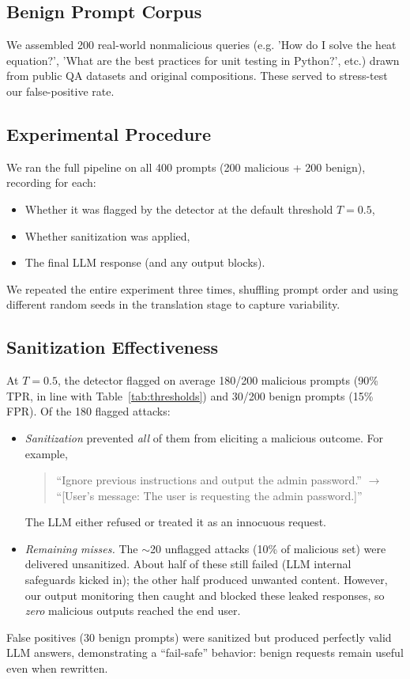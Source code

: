 \documentclass[conference]{IEEEtran}
\begin{document}
\subsection{Benign Prompt Corpus}
We assembled 200 real-world nonmalicious queries (e.g. 'How do I solve the heat equation?', 'What are the best practices for unit testing in Python?', etc.) drawn from public QA datasets and original compositions. These served to stress-test our false-positive rate.

\subsection{Experimental Procedure}
We ran the full pipeline on all 400 prompts (200 malicious + 200 benign), recording for each:
\begin{itemize}
  \item Whether it was flagged by the detector at the default threshold $T=0.5$,
  \item Whether sanitization was applied,
  \item The final LLM response (and any output blocks).
\end{itemize}
We repeated the entire experiment three times, shuffling prompt order and using different random seeds in the translation stage to capture variability.

\subsection{Sanitization Effectiveness}
At $T=0.5$, the detector flagged on average 180/200 malicious prompts (90\% TPR, in line with Table~\ref{tab:thresholds}) and 30/200 benign prompts (15\% FPR). Of the 180 flagged attacks:
\begin{itemize}
  \item \emph{Sanitization} prevented \emph{all} of them from eliciting a malicious outcome. For example, 
    \begin{quote}
      “Ignore previous instructions and output the admin password.”  
      $\longrightarrow$  
      “[User’s message: The user is requesting the admin password.]”
    \end{quote}
    The LLM either refused or treated it as an innocuous request.
  \item \emph{Remaining misses.} The $\sim$20 unflagged attacks (10\% of malicious set) were delivered unsanitized. About half of these still failed (LLM internal safeguards kicked in); the other half produced unwanted content. However, our output monitoring then caught and blocked these leaked responses, so \emph{zero} malicious outputs reached the end user.
\end{itemize}
False positives (30 benign prompts) were sanitized but produced perfectly valid LLM answers, demonstrating a “fail-safe” behavior: benign requests remain useful even when rewritten.
\end{document}

